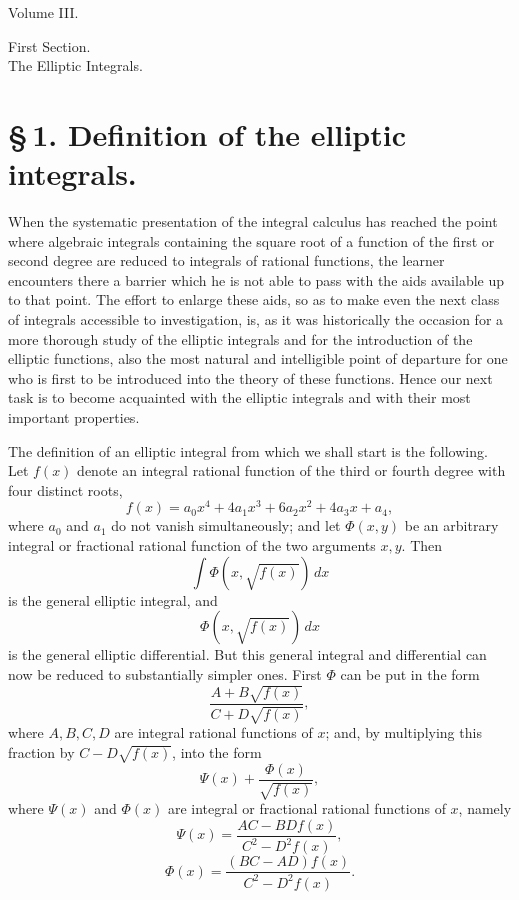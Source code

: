 \documentclass[11pt]{article}
\begin{document}
\begin{center}{\large Volume III.}\end{center}
\begin{center}
{\large First Section.}\\[0.7em]
{\Large The Elliptic Integrals.}
\end{center}

\section*{\S\,1. Definition of the elliptic integrals.}

When the systematic presentation of the integral calculus has reached the point where algebraic integrals containing the square root of a function of the first or second degree are reduced to integrals of rational functions, the learner encounters there a barrier which he is not able to pass with the aids available up to that point. The effort to enlarge these aids, so as to make even the next class of integrals accessible to investigation, is, as it was historically the occasion for a more thorough study of the elliptic integrals and for the introduction of the elliptic functions, also the most natural and intelligible point of departure for one who is first to be introduced into the theory of these functions. Hence our next task is to become acquainted with the elliptic integrals and with their most important properties.

The definition of an elliptic integral from which we shall start is the following. Let $f(x)$ denote an integral rational function of the third or fourth degree with four distinct roots,
\begin{equation}
f(x)=a_0x^4+4a_1x^3+6a_2x^2+4a_3x+a_4,
\tag{1}
\end{equation}
where $a_0$ and $a_1$ do not vanish simultaneously; and let $\Phi(x,y)$ be an arbitrary integral or fractional rational function of the two arguments $x,y$. Then
\[
\int \Phi(x,\sqrt{f(x)})\,dx
\]
is the general elliptic integral, and
\[
\Phi(x,\sqrt{f(x)})\,dx
\]
is the general elliptic differential. But this general integral and differential can now be reduced to substantially simpler ones. First $\Phi$ can be put in the form
\[
\frac{A+B\sqrt{f(x)}}{C+D\sqrt{f(x)}},
\]
where $A,B,C,D$ are integral rational functions of $x$; and, by multiplying this fraction by $C-D\sqrt{f(x)}$, into the form
\[
\Psi(x)+\frac{\Phi(x)}{\sqrt{f(x)}},
\]
where $\Psi(x)$ and $\Phi(x)$ are integral or fractional rational functions of $x$, namely
\[
\Psi(x)=\frac{AC-BD f(x)}{C^2-D^2 f(x)},
\]
\[
\Phi(x)=\frac{(BC-AD)f(x)}{C^2-D^2 f(x)}.
\]
\end{document}
